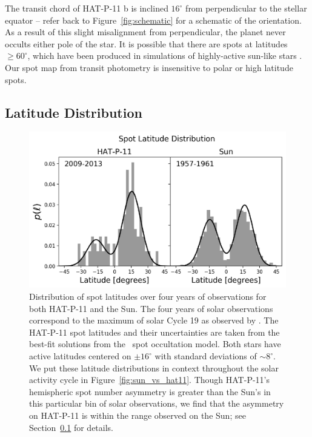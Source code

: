 The transit chord of HAT-P-11 b is inclined $16^\circ$ from perpendicular to the stellar equator -- refer back to Figure~\ref{fig:schematic} for a schematic of the orientation. As a result of this slight misalignment from perpendicular, the planet never occults either pole of the star. It is possible that there are spots at latitudes $\ge 60^\circ$, which have been produced in simulations of highly-active sun-like stars \citep[e.g.][]{Schrijver2001}. Our spot map from transit photometry is insensitive to polar or high latitude spots. 

\subsection{Latitude Distribution} \label{sec:lat_dist}

\begin{figure}
\centering
\includegraphics[scale=0.48]{stsp_hat_p_11/asymmetric_latitudes.pdf}
\caption{Distribution of spot latitudes over four years of observations for both HAT-P-11 and the Sun. The four years of solar observations correspond to the maximum of solar Cycle 19 as observed by \citet{Howard1984}. The HAT-P-11 spot latitudes and their uncertainties are taken from the best-fit solutions from the \stsp\ spot occultation model. Both stars have active latitudes centered on $\pm 16^\circ$ with standard deviations of $\sim 8^\circ$. We put these latitude distributions in context throughout the solar activity cycle in Figure~\ref{fig:sun_vs_hat11}. Though HAT-P-11's hemispheric spot number asymmetry is greater than the Sun's in this particular bin of solar observations, we find that the asymmetry on HAT-P-11 is within the range observed on the Sun; see Section~\ref{sec:lat_dist} for details.}
\label{fig:latitude_model}
\end{figure}

